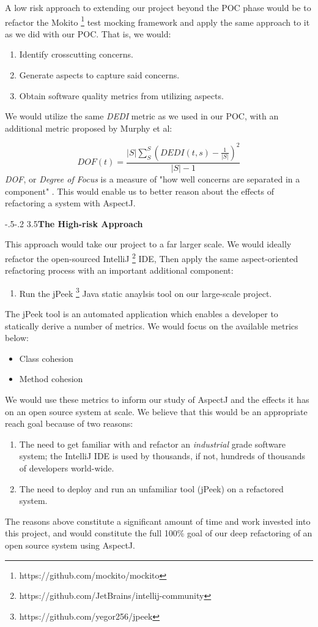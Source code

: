 \documentclass[sigconf]{acmart}
\makeatletter
\def\subsubsection{\@startsection{subsubsection}{3}{10pt}%
                                 {-.5\baselineskip \@plus -2\p@ \@minus -.2\p@}%
                 {3.5\p@}{\subsubsectionfont}}
\makeatother
\begin{document}
A low risk approach to extending our project beyond the POC phase would be to refactor the Mokito \footnote{https://github.com/mockito/mockito} test mocking framework and apply the same approach to it as we did with our POC. That is, we would:
\begin{enumerate}
    \item Identify crosscutting concerns.
    \item Generate aspects to capture said concerns.
    \item Obtain software quality metrics from utilizing aspects.
\end{enumerate}
We would utilize the same \textit{DEDI} metric as we used in our POC, with an additional metric proposed by Murphy et al:

$$DOF(t) = \frac{|S| \sum_S^S(DEDI(t,s) - \frac{1}{|S|})^2}{|S| - 1}$$
\textit{DOF}, or \textit{Degree of Focus} is a measure of "how well concerns are separated in a component" \cite{murphy}. This would enable us to better reason about the effects of refactoring a system with AspectJ.

\subsubsection{\textbf{The High-risk Approach}}

This approach would take our project to a far larger scale. We would ideally refactor the open-sourced IntelliJ \footnote{https://github.com/JetBrains/intellij-community} IDE, Then apply the same aspect-oriented refactoring process with an important additional component:
\begin{enumerate}
    \item Run the jPeek \footnote{https://github.com/yegor256/jpeek} Java static anaylsis tool on our large-scale project.
\end{enumerate}
The jPeek tool is an automated application which enables a developer to statically derive a number of metrics. We would focus on the available metrics below:
\begin{itemize}
    \item Class cohesion
    \item Method cohesion
\end{itemize}
We would use these metrics to inform our study of AspectJ and the effects it has on an open source system at scale. We believe that this would be an appropriate reach goal because of two reasons:
\begin{enumerate}
    \item The need to get familiar with and refactor an \textit{industrial} grade software system; the IntelliJ IDE is used by thousands, if not, hundreds of thousands of developers world-wide.
    \item The need to deploy and run an unfamiliar tool (jPeek) on a refactored system.
\end{enumerate}
The reasons above constitute a significant amount of time and work invested into this project, and would constitute the full 100\% goal of our deep refactoring of an open source system using AspectJ.
\end{document}
